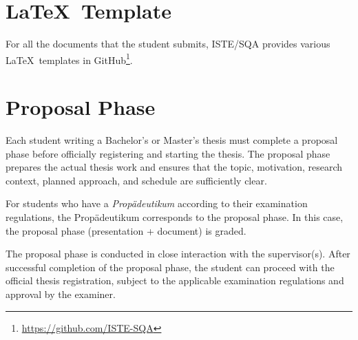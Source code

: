 \documentclass[11pt,a4paper]{article}
\begin{document}
\section{\LaTeX\ Template}
For all the documents that the student submits, ISTE/SQA provides various \LaTeX\ templates in GitHub\footnote{\url{https://github.com/ISTE-SQA}}.

\section{Proposal Phase}\label{sec:proposal}
Each student writing a Bachelor's or Master's thesis must complete a proposal phase before officially registering and starting the thesis.
The proposal phase prepares the actual thesis work and ensures that the topic, motivation, research context, planned approach, and schedule are sufficiently clear.

For students who have a \textit{Prop\"adeutikum} according to their examination regulations, the Prop\"adeutikum corresponds to the proposal phase.
In this case, the proposal phase (presentation + document) is graded.

The proposal phase is conducted in close interaction with the supervisor(s). After successful completion of the proposal phase, the student can proceed with the official thesis registration, subject to the applicable examination regulations and approval by the examiner.
\end{document}
